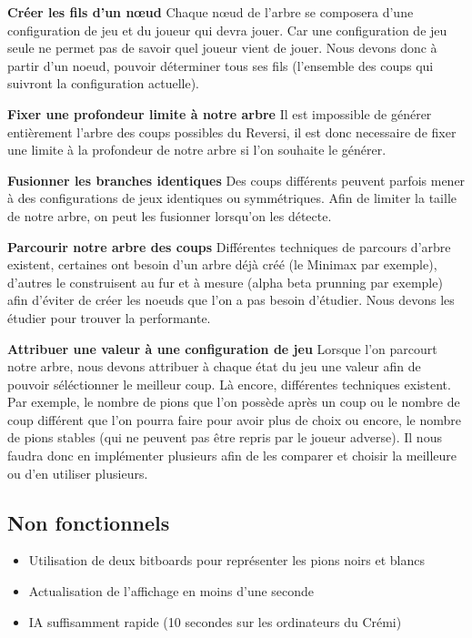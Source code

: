 \documentclass[12pt]{article}
\begin{document}
\textbf{Créer les fils d'un nœud}
Chaque nœud de l'arbre se composera d'une configuration de jeu et du joueur qui devra jouer. Car une configuration de jeu seule ne permet pas de savoir quel joueur vient de jouer. Nous devons donc à partir d'un noeud, pouvoir déterminer tous ses fils (l'ensemble des coups qui suivront la configuration actuelle).

\textbf{Fixer une profondeur limite à notre arbre}
Il est impossible de générer entièrement l'arbre des coups possibles du Reversi, il est donc necessaire de fixer une limite à la profondeur de notre arbre si l'on souhaite le générer.

\textbf{Fusionner les branches identiques}
Des coups différents peuvent parfois mener à des configurations de jeux identiques ou symmétriques. Afin de limiter la taille de notre arbre, on peut les fusionner lorsqu'on les détecte.

\textbf{Parcourir notre arbre des coups}
Différentes techniques de parcours d'arbre existent, certaines ont besoin d'un arbre déjà créé (le Minimax\cite{minimax} par exemple), d'autres le construisent au fur et à mesure (alpha beta prunning\cite{alpha-beta} par exemple) afin d'éviter de créer les noeuds que l'on a pas besoin d'étudier. Nous devons les étudier pour trouver la performante.

\textbf{ Attribuer une valeur à une configuration de jeu}
Lorsque l'on parcourt notre arbre, nous devons attribuer à chaque état du jeu une valeur afin de pouvoir séléctionner le meilleur coup. Là encore, différentes techniques existent. Par exemple, le nombre de pions que l'on possède après un coup ou le nombre de coup différent que l'on pourra faire pour avoir plus de choix ou encore, le nombre de pions stables (qui ne peuvent pas être repris par le joueur adverse). Il nous faudra donc en implémenter plusieurs afin de les comparer et choisir la meilleure ou d'en utiliser plusieurs.

\subsection{Non fonctionnels}
\begin{itemize}
\item Utilisation de deux bitboards\cite{introbitboard} pour représenter les pions noirs et blancs
\item Actualisation de l'affichage en moins d'une seconde
\item IA suffisamment rapide (10 secondes sur les ordinateurs du Crémi)
\end{itemize}
\end{document}
